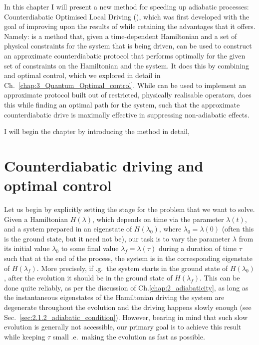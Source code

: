 In this chapter I will present a new method for speeding up adiabatic processes: Counterdiabatic Optimised Local Driving (), which was first developed with the goal of improving upon the results of  while retaining the advantages that it offers. Namely:  is a method that, given a time-dependent Hamiltonian and a set of physical constraints for the system that is being driven, can be used to construct an approximate counterdiabatic protocol that performs optimally for the given set of constraints on the Hamiltonian and the system. It does this by combining  and optimal control, which we explored in detail in Ch.~\ref{chap:3_Quantum_Optimal_control}. While  can be used to implement an approximate  protocol built out of restricted, physically realisable operators,  does this while finding an optimal path for the system, such that the approximate counterdiabatic drive is maximally effective in suppressing non-adiabatic effects.

I will begin the chapter by introducing the  method in detail,

\section{Counterdiabatic driving and optimal control}

Let us begin by explicitly setting the stage for the problem that we want to solve. Given a Hamiltonian $H(\lambda)$, which depends on time via the parameter $\lambda(t)$, and a system prepared in an eigenstate of $H(\lambda_0)$, where $\lambda_0 = \lambda(0)$ (often this is the ground state, but it need not be), our task is to vary the parameter $\lambda$ from its initial value $\lambda_0$ to some final value $\lambda_f = \lambda(\tau)$ during a duration of time $\tau$ such that at the end of the process, the system is in the corresponding eigenstate of $H(\lambda_f)$. More precisely, if \@e.g.~the system starts in the ground state of $H(\lambda_0)$, after the evolution it should be in the ground state of $H(\lambda_f)$. This can be done quite reliably, as per the discussion of Ch.\ref{chap:2_adiabaticity}, as long as the instantaneous eigenstates of the Hamiltonian driving the system are degenerate throughout the evolution and the driving happens slowly enough (see Sec.~\ref{sec:2.1.2_adiabatic_condition}). However, bearing in mind that such slow evolution is generally not accessible, our primary goal is to achieve this result while keeping $\tau$ small \@i.e.~making the evolution as fast as possible. 

